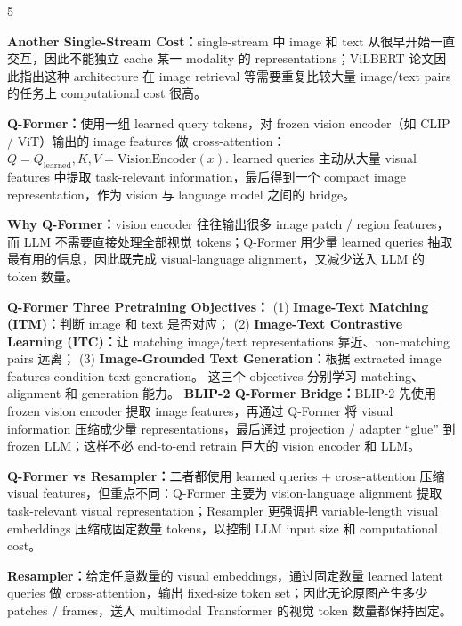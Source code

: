 \documentclass[a4paper, landscape]{article}
\begin{document}
\begin{multicols}{5}
\par \textbf{Another Single-Stream Cost：}single-stream 中 image 和 text 从很早开始一直交互，因此不能独立 cache 某一 modality 的 representations；ViLBERT 论文因此指出这种 architecture 在 image retrieval 等需要重复比较大量 image/text pairs 的任务上 computational cost 很高。

\par \textbf{Q-Former：}使用一组 learned query tokens，对 frozen vision encoder（如 CLIP / ViT）输出的 image features 做 cross-attention：
\(
Q=Q_{\mathrm{learned}},
K,V=\mathrm{VisionEncoder}(x).
\)
learned queries 主动从大量 visual features 中提取 task-relevant information，最后得到一个 compact image representation，作为 vision 与 language model 之间的 bridge。

\par \textbf{Why Q-Former：}vision encoder 往往输出很多 image patch / region features，而 LLM 不需要直接处理全部视觉 tokens；Q-Former 用少量 learned queries 抽取最有用的信息，因此既完成 visual-language alignment，又减少送入 LLM 的 token 数量。

\par \textbf{Q-Former Three Pretraining Objectives：}
(1) \textbf{Image-Text Matching (ITM)：}判断 image 和 text 是否对应；
(2) \textbf{Image-Text Contrastive Learning (ITC)：}让 matching image/text representations 靠近、non-matching pairs 远离；
(3) \textbf{Image-Grounded Text Generation：}根据 extracted image features condition text generation。
这三个 objectives 分别学习 matching、alignment 和 generation 能力。
\textbf{BLIP-2 Q-Former Bridge：}BLIP-2 先使用 frozen vision encoder 提取 image features，再通过 Q-Former 将 visual information 压缩成少量 representations，最后通过 projection / adapter ``glue'' 到 frozen LLM；这样不必 end-to-end retrain 巨大的 vision encoder 和 LLM。

\par \textbf{Q-Former vs Resampler：}二者都使用 learned queries + cross-attention 压缩 visual features，但重点不同：Q-Former 主要为 vision-language alignment 提取 task-relevant visual representation；Resampler 更强调把 variable-length visual embeddings 压缩成固定数量 tokens，以控制 LLM input size 和 computational cost。
\par \textbf{Resampler：}给定任意数量的 visual embeddings，通过固定数量 learned latent queries 做 cross-attention，输出 fixed-size token set；因此无论原图产生多少 patches / frames，送入 multimodal Transformer 的视觉 token 数量都保持固定。


\end{multicols}
\end{document}
